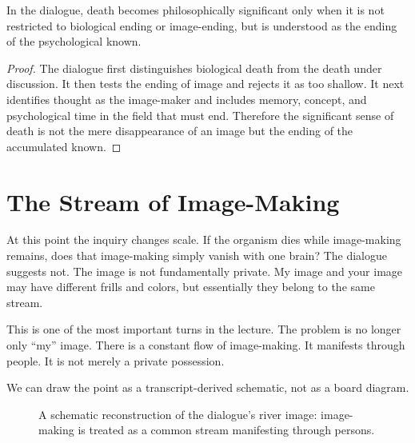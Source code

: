 \begin{proposition}
In the dialogue, death becomes philosophically significant only when it is not restricted to biological ending or image-ending, but is understood as the ending of the psychological known.
\end{proposition}

\begin{proof}
The dialogue first distinguishes biological death from the death under discussion. It then tests the ending of image and rejects it as too shallow. It next identifies thought as the image-maker and includes memory, concept, and psychological time in the field that must end. Therefore the significant sense of death is not the mere disappearance of an image but the ending of the accumulated known.
\end{proof}

\section{The Stream of Image-Making}

At this point the inquiry changes scale. If the organism dies while image-making remains, does that image-making simply vanish with one brain? The dialogue suggests not. The image is not fundamentally private. My image and your image may have different frills and colors, but essentially they belong to the same stream.

This is one of the most important turns in the lecture. The problem is no longer only ``my'' image. There is a constant flow of image-making. It manifests through people. It is not merely a private possession.

We can draw the point as a transcript-derived schematic, not as a board diagram.

\begin{figure}
\centering
{}
\caption{A schematic reconstruction of the dialogue's river image: image-making is treated as a common stream manifesting through persons.}
\end{figure}

